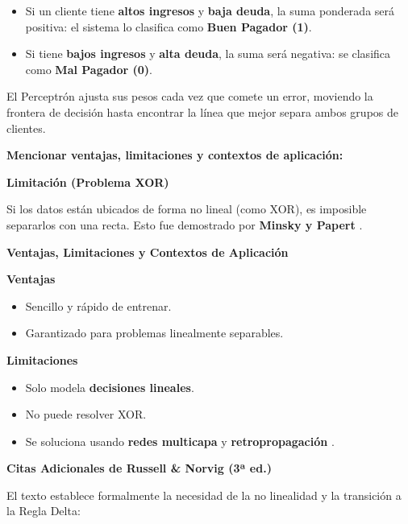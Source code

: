\documentclass[letterpaper,12pt]{article}
\begin{document}
\begin{itemize}
    \begin{itemize}
        \item Si un cliente tiene \textbf{altos ingresos} y \textbf{baja deuda}, la suma ponderada será positiva: el sistema lo clasifica como \textbf{Buen Pagador (1)}.
        \item Si tiene \textbf{bajos ingresos} y \textbf{alta deuda}, la suma será negativa: se clasifica como \textbf{Mal Pagador (0)}.
    \end{itemize}
    
    El Perceptrón ajusta sus pesos cada vez que comete un error, moviendo la frontera de decisión hasta encontrar la línea que mejor separa ambos grupos de clientes.
    
    


    \vspace{0.2 cm}
    
    \textbf{Mencionar ventajas, limitaciones y contextos de aplicación:}


    \vspace{0.2 cm}

    \vspace{0.1 cm}
    \textbf{Limitación (Problema XOR)}

    
    Si los datos están ubicados de forma no lineal (como XOR), es imposible separarlos con una recta.  
    Esto fue demostrado por \textbf{Minsky y Papert} \cite{Minsky1969}.
    
    \textbf{Ventajas, Limitaciones y Contextos de Aplicación}

    \textbf{Ventajas}
    \begin{itemize}
        \item Sencillo y rápido de entrenar.
        \item Garantizado para problemas linealmente separables.
    \end{itemize}


   \textbf{Limitaciones}
    \begin{itemize}
        \item Solo modela \textbf{decisiones lineales}.
        \item No puede resolver XOR.
        \item Se soluciona usando \textbf{redes multicapa} y \textbf{retropropagación} \cite{Rumelhart1986}.
    \end{itemize}
    
        
    \textbf{Citas Adicionales de Russell \& Norvig (3ª ed.)}
    
    El texto establece formalmente la necesidad de la no linealidad y la transición a la Regla Delta:
    

\end{itemize}
\end{document}
